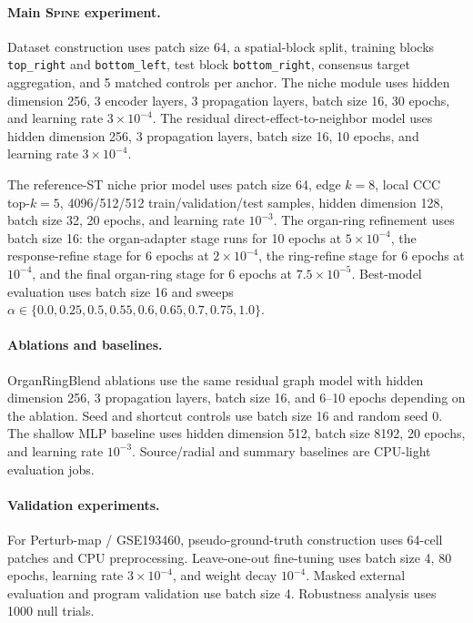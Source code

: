 \documentclass[sigconf,review,balance=false]{acmart}
\newcommand{\methodname}{\textsc{Spine}\xspace}
\begin{document}
\paragraph{Main \methodname{} experiment.}
Dataset construction uses patch size 64, a spatial-block split, training blocks \texttt{top\_right} and \texttt{bottom\_left}, test block \texttt{bottom\_right}, consensus target aggregation, and 5 matched controls per anchor. The niche module uses hidden dimension 256, 3 encoder layers, 3 propagation layers, batch size 16, 30 epochs, and learning rate $3\times10^{-4}$. The residual direct-effect-to-neighbor model uses hidden dimension 256, 3 propagation layers, batch size 16, 10 epochs, and learning rate $3\times10^{-4}$.

The reference-ST niche prior model uses patch size 64, edge $k=8$, local CCC top-$k=5$, 4096/512/512 train/validation/test samples, hidden dimension 128, batch size 32, 20 epochs, and learning rate $10^{-3}$. The organ-ring refinement uses batch size 16: the organ-adapter stage runs for 10 epochs at $5\times10^{-4}$, the response-refine stage for 6 epochs at $2\times10^{-4}$, the ring-refine stage for 6 epochs at $10^{-4}$, and the final organ-ring stage for 6 epochs at $7.5\times10^{-5}$. Best-model evaluation uses batch size 16 and sweeps $\alpha\in\{0.0,0.25,0.5,0.55,0.6,0.65,0.7,0.75,1.0\}$.

\paragraph{Ablations and baselines.}
OrganRingBlend ablations use the same residual graph model with hidden dimension 256, 3 propagation layers, batch size 16, and 6--10 epochs depending on the ablation. Seed and shortcut controls use batch size 16 and random seed 0. The shallow MLP baseline uses hidden dimension 512, batch size 8192, 20 epochs, and learning rate $10^{-3}$. Source/radial and summary baselines are CPU-light evaluation jobs.

\paragraph{Validation experiments.}
For Perturb-map / GSE193460, pseudo-ground-truth construction uses 64-cell patches and CPU preprocessing. Leave-one-out fine-tuning uses batch size 4, 80 epochs, learning rate $3\times10^{-4}$, and weight decay $10^{-4}$. Masked external evaluation and program validation use batch size 4. Robustness analysis uses 1000 null trials.
\end{document}
